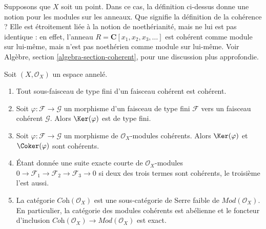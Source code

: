 \begin{example}
\label{example-coherent-not-Noetherian}
Supposons que $X$ soit un point. Dans ce cas, la définition
ci-dessus donne une notion pour les modules sur les anneaux.
Que signifie la définition de la cohérence ?
Elle est étroitement liée à la notion de noethérianité,
mais ne lui est pas identique : en effet, l'anneau
$R = \mathbf{C}[x_1, x_2, x_3, \ldots]$ est cohérent
comme module sur lui-même, mais n'est pas noethérien comme module
sur lui-même. Voir Algèbre, section \ref{algebra-section-coherent},
pour une discussion plus approfondie.
\end{example}

\begin{lemma}
\label{lemma-coherent-abelian}
Soit $(X, \mathcal{O}_X)$ un espace annelé.
\begin{enumerate}
\item Tout sous-faisceau de type fini d'un faisceau cohérent est cohérent.
\item Soit $\varphi : \mathcal{F} \to \mathcal{G}$
un morphisme d'un faisceau de type fini $\mathcal{F}$
vers un faisceau cohérent $\mathcal{G}$. Alors $\Ker(\varphi)$ est de type fini.
\item Soit $\varphi : \mathcal{F} \to \mathcal{G}$ un morphisme
de $\mathcal{O}_X$-modules cohérents. Alors
$\Ker(\varphi)$ et
$\Coker(\varphi)$ sont cohérents.
\item Étant donnée une suite exacte courte de $\mathcal{O}_X$-modules
$0 \to \mathcal{F}_1 \to \mathcal{F}_2 \to \mathcal{F}_3 \to 0$
si deux des trois termes sont cohérents, le troisième l'est aussi.
\item La catégorie $\textit{Coh}(\mathcal{O}_X)$ est une sous-catégorie de Serre faible
de $\textit{Mod}(\mathcal{O}_X)$. En particulier, la catégorie des
modules cohérents est abélienne et le foncteur d'inclusion
$\textit{Coh}(\mathcal{O}_X) \to \textit{Mod}(\mathcal{O}_X)$
est exact.
\end{enumerate}
\end{lemma}

